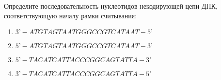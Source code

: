 
Определите последовательность нуклеотидов
некодирующей цепи ДНК, соответствующую началу рамки считывания:

\begin{enumerate}
    \item $3’-ATGTAGTAATGGGCCGTCATAAT-5’$
    \item $5’-ATGTAGTAATGGGCCGTCATAAT-3’$
    \item $5’-TACATCATTACCCGGCAGTATTA-3’$
    \item $3’-TACATCATTACCCGGCAGTATTA-5’$
\end{enumerate}

